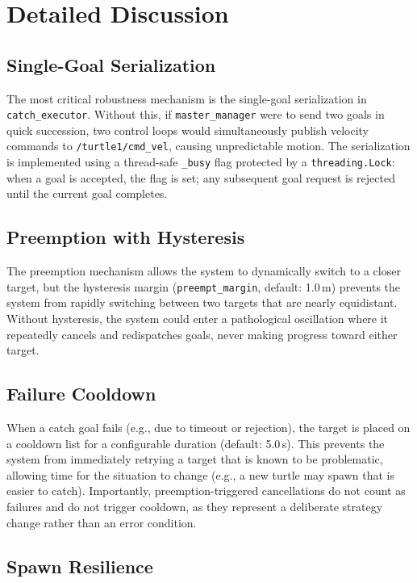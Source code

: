 \section{Detailed Discussion}

\subsection{Single-Goal Serialization}

The most critical robustness mechanism is the single-goal serialization in \texttt{catch\_executor}. Without this, if \texttt{master\_manager} were to send two goals in quick succession, two control loops would simultaneously publish velocity commands to \texttt{/turtle1/cmd\_vel}, causing unpredictable motion. The serialization is implemented using a thread-safe \texttt{\_busy} flag protected by a \texttt{threading.Lock}: when a goal is accepted, the flag is set; any subsequent goal request is rejected until the current goal completes.

\subsection{Preemption with Hysteresis}

The preemption mechanism allows the system to dynamically switch to a closer target, but the hysteresis margin (\texttt{preempt\_margin}, default: 1.0\,m) prevents the system from rapidly switching between two targets that are nearly equidistant. Without hysteresis, the system could enter a pathological oscillation where it repeatedly cancels and redispatches goals, never making progress toward either target.

\subsection{Failure Cooldown}

When a catch goal fails (e.g., due to timeout or rejection), the target is placed on a cooldown list for a configurable duration (default: 5.0\,s). This prevents the system from immediately retrying a target that is known to be problematic, allowing time for the situation to change (e.g., a new turtle may spawn that is easier to catch). Importantly, preemption-triggered cancellations do not count as failures and do not trigger cooldown, as they represent a deliberate strategy change rather than an error condition.

\subsection{Spawn Resilience}

